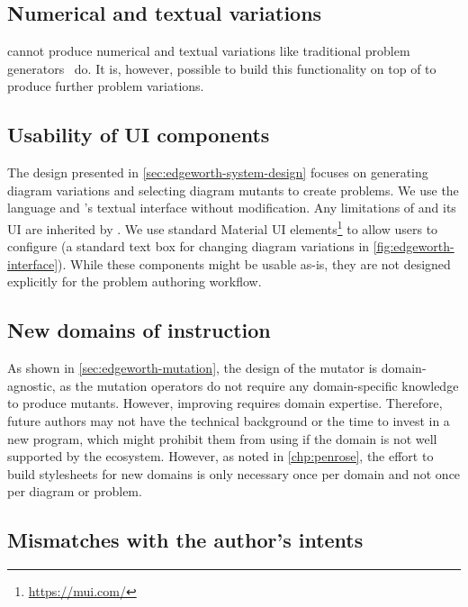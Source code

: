 \subsection{Numerical and textual variations}

\Edgeworth cannot produce numerical and textual variations like traditional problem generators~\cite{aleven_cognitive_2006, ASSISTment} do. It is, however, possible to build this functionality on top of \Edgeworth to produce further problem variations. 

\subsection{Usability of UI components}

The design presented in \cref{sec:edgeworth-system-design} focuses on generating diagram variations and selecting diagram mutants to create problems. We use the \Substance language and \Penrose's textual interface without modification. Any limitations of \Substance and its UI are inherited by \Edgeworth. We use standard Material UI elements\footnote{\url{https://mui.com/}} to allow users to configure \Edgeworth (\eg a standard text box for changing diagram variations in \cref{fig:edgeworth-interface}). While these components might be usable as-is, they are not designed explicitly for the problem authoring workflow. 

\subsection{New domains of instruction}
\label{sec:extension}

As shown in \cref{sec:edgeworth-mutation}, the design of the \Edgeworth mutator is domain-agnostic, as the mutation operators do not require any domain-specific knowledge to produce mutants. However, improving \Style requires domain expertise. Therefore, future \Edgeworth authors may not have the technical background or the time to invest in a new \Style program, which might prohibit them from using \Edgeworth if the domain is not well supported by the \Penrose ecosystem. However, as noted in \cref{chp:penrose}, the effort to build \Penrose stylesheets for new domains is only necessary once per domain and not once per diagram or problem.

\subsection{Mismatches with the author's intents} 

